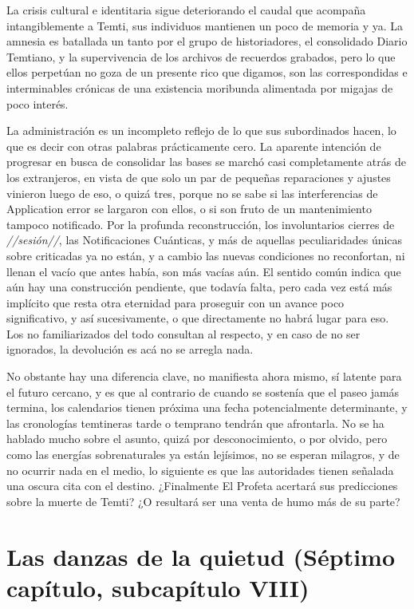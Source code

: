 \documentclass[
  spanish,
]{book}
\begin{document}
La crisis cultural e identitaria sigue deteriorando el caudal que acompaña intangiblemente a Temti, sus individuos mantienen un poco de memoria y ya. La amnesia es batallada un tanto por el grupo de historiadores, el consolidado Diario Temtiano, y la supervivencia de los archivos de recuerdos grabados, pero lo que ellos perpetúan no goza de un presente rico que digamos, son las correspondidas e interminables crónicas de una existencia moribunda alimentada por migajas de poco interés.

La administración es un incompleto reflejo de lo que sus subordinados hacen, lo que es decir con otras palabras prácticamente cero. La aparente intención de progresar en busca de consolidar las bases se marchó casi completamente atrás de los extranjeros, en vista de que solo un par de pequeñas reparaciones y ajustes vinieron luego de eso, o quizá tres, porque no se sabe si las interferencias de Application error se largaron con ellos, o si son fruto de un mantenimiento tampoco notificado. Por la profunda reconstrucción, los involuntarios cierres de \emph{//sesión//}, las Notificaciones Cuánticas, y más de aquellas peculiaridades únicas sobre criticadas ya no están, y a cambio las nuevas condiciones no reconfortan, ni llenan el vacío que antes había, son más vacías aún. El sentido común indica que aún hay una construcción pendiente, que todavía falta, pero cada vez está más implícito que resta otra eternidad para proseguir con un avance poco significativo, y así sucesivamente, o que directamente no habrá lugar para eso. Los no familiarizados del todo consultan al respecto, y en caso de no ser ignorados, la devolución es acá no se arregla nada.

No obstante hay una diferencia clave, no manifiesta ahora mismo, sí latente para el futuro cercano, y es que al contrario de cuando se sostenía que el paseo jamás termina, los calendarios tienen próxima una fecha potencialmente determinante, y las cronologías temtineras tarde o temprano tendrán que afrontarla. No se ha hablado mucho sobre el asunto, quizá por desconocimiento, o por olvido, pero como las energías sobrenaturales ya están lejísimos, no se esperan milagros, y de no ocurrir nada en el medio, lo siguiente es que las autoridades tienen señalada una oscura cita con el destino. ¿Finalmente El Profeta acertará sus predicciones sobre la muerte de Temti? ¿O resultará ser una venta de humo más de su parte?

\hypertarget{las-danzas-de-la-quietud-suxe9ptimo-capuxedtulo-subcapuxedtulo-viii}{%
\section{Las danzas de la quietud (Séptimo capítulo, subcapítulo VIII)}\label{las-danzas-de-la-quietud-suxe9ptimo-capuxedtulo-subcapuxedtulo-viii}}
\end{document}
